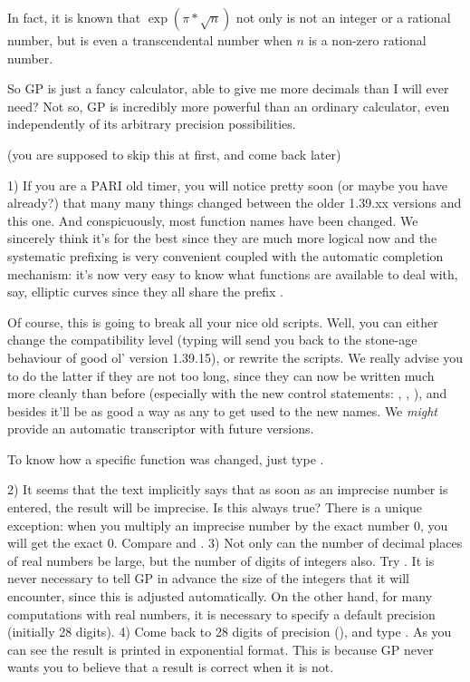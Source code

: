 In fact, it is known that $\exp(\pi*\sqrt{n})$ not only is not an integer
or a rational number, but is even a transcendental number when $n$ is a
non-zero rational number.

So GP is just a fancy calculator, able to give me more decimals than I will
ever need? Not so, GP is incredibly more powerful than an ordinary
calculator, even independently of its arbitrary precision possibilities.

 (you are supposed to skip this at first,
and come back later)

1) If you are a PARI old timer, you will notice pretty soon (or maybe you
have already?) that many many things changed between the older 1.39.xx
versions and this one. And conspicuously, most function names have been
changed. We sincerely think it's for the best since they are much more
logical now and the systematic prefixing is very convenient coupled with the
automatic completion mechanism: it's now very easy to know what functions are
available to deal with, say, elliptic curves since they all share the prefix
.

Of course, this is going to break all your nice old scripts. Well, you can
either change the compatibility level (typing 
will send you back to the stone-age behaviour of good ol' version 1.39.15),
or rewrite the scripts. We really advise you to do the latter if they are not
too long, since they can now be written much more cleanly than before
(especially with the new control statements: , ,
), and besides it'll be as good a way as any to get used to the new
names. We {\it might} provide an automatic transcriptor with future versions.

To know how a specific function was changed, just type
.

2) It seems that the text implicitly says that as soon as an imprecise number
is entered, the result will be imprecise. Is this always true? There is a
unique exception: when you multiply an imprecise number by the exact number 0,
you will get the exact 0. Compare  and . \smallskip
%
3) Not only can the number of decimal places of real numbers be large, but the
number of digits of integers also. Try . It is never necessary to
tell GP in advance the size of the integers that it will encounter, since this
is adjusted automatically. On the other hand, for many computations with real
numbers, it is necessary to specify a default precision (initially 28 digits).
\smallskip
%
4) Come back to 28 digits of precision (), and type
. As you can see the result is printed in exponential format.
This is because GP never wants you to believe that a result is correct when it
is not.

